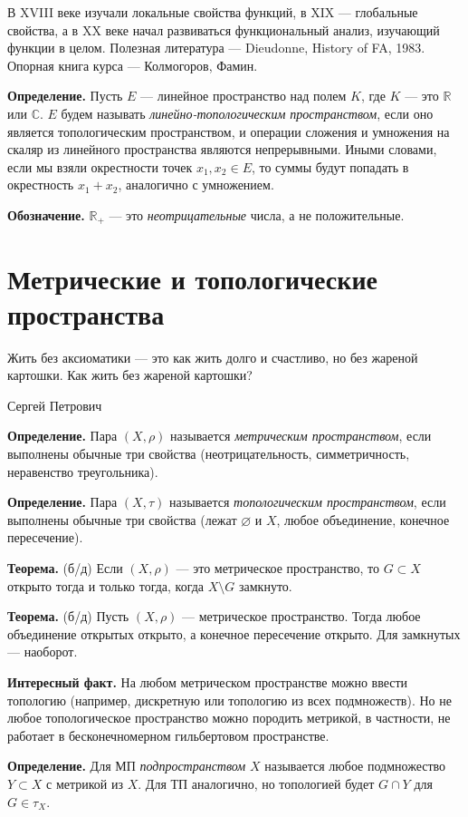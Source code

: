 В XVIII веке изучали локальные свойства функций, в XIX --- глобальные свойства, а в XX веке начал развиваться функциональный анализ, изучающий функции в целом.
Полезная литература --- Dieudonne, History of FA, 1983.
Опорная книга курса --- Колмогоров, Фамин.

\textbf{Определение.} Пусть $E$ --- линейное пространство над полем $K$, где $K$ --- это $\mathbb R$ или $\mathbb C$.
$E$ будем называть \textit{линейно-топологическим пространством}, если оно является топологическим пространством, и операции сложения и умножения на скаляр из линейного пространства являются непрерывными.
Иными словами, если мы взяли окрестности точек $x_1, x_2 \in E$, то суммы будут попадать в окрестность $x_1 + x_2$, аналогично с умножением.

\textbf{Обозначение.} $\mathbb R_+$ --- это \textit{неотрицательные} числа, а не положительные.

\section{Метрические и топологические пространства}
\epigraph{Жить без аксиоматики --- это как жить долго и счастливо, но без жареной картошки. Как жить без жареной картошки?}{Сергей Петрович}

\textbf{Определение.} Пара $(X, \rho)$ называется \textit{метрическим пространством}, если выполнены обычные три свойства (неотрицательность, симметричность, неравенство треугольника).

\textbf{Определение.} Пара $(X, \tau)$ называется \textit{топологическим пространством}, если выполнены обычные три свойства (лежат $\varnothing$ и $X$, любое объединение, конечное пересечение).

\textbf{Теорема.} (б/д) Если $(X, \rho)$ --- это метрическое пространство, то $G \subset X$ открыто тогда и только тогда, когда $X \setminus G$ замкнуто.

\textbf{Теорема.} (б/д) Пусть $(X, \rho)$ --- метрическое пространство.
Тогда любое объединение открытых открыто, а конечное пересечение открыто.
Для замкнутых --- наоборот.

\textbf{Интересный факт.} На любом метрическом пространстве можно ввести топологию (например, дискретную или топологию из всех подмножеств).
Но не любое топологическое пространство можно породить метрикой, в частности, не работает в бесконечномерном гильбертовом пространстве.

\textbf{Определение.} Для МП \textit{подпространством} $X$ называется любое подмножество $Y \subset X$ с метрикой из $X$.
Для ТП аналогично, но топологией будет $G \cap Y$ для $G \in \tau_X$.

